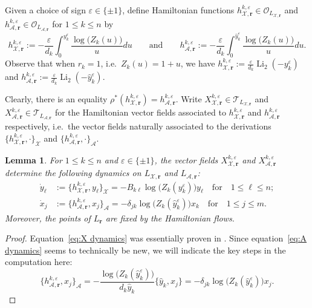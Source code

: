 \documentclass{amsart}
\newtheorem{lemma}[theorem]{Lemma}
\numberwithin{equation}{section}
\newcommand{\bfr}{{\boldsymbol{r}}}
\newcommand{\cA}{\mathcal{A}}
\newcommand{\cO}{\mathcal{O}}
\newcommand{\cT}{\mathcal{T}}
\newcommand{\cX}{\mathcal{X}}
\newcommand{\Li}{\operatorname{Li}}
\begin{document}
Given a choice of sign $\varepsilon\in\{\pm1\}$, define Hamiltonian functions $h^{k,\varepsilon}_{\cX,\bfr}\in\cO_{L_{\cX,\bfr}}$ and $h^{k,\varepsilon}_{\cA,\bfr}\in\cO_{L_{\cA,\bfr}}$ for $1\le k\le n$ by
\begin{equation}
  \label{eq:hamiltonians}
  h_{\cX,\bfr}^{k,\varepsilon}:=-\frac{\varepsilon}{d_k}\int_0^{y_k^\varepsilon} \frac{\log\big(Z_k(u)\big)}{u}du\qquad\text{and}\qquad h_{\cA,\bfr}^{k,\varepsilon}:=-\frac{\varepsilon}{d_k}\int_0^{\hat y_k^\varepsilon} \frac{\log\big(Z_k(u)\big)}{u}du.
\end{equation}
Observe that when $r_k=1$, i.e.\ $Z_k(u)=1+u$, we have $h_{\cX,\bfr}^{k,\varepsilon}:=\frac{\varepsilon}{d_k}\Li_2(-y_k^\varepsilon)$ and $h_{\cA,\bfr}^{k,\varepsilon}:=\frac{\varepsilon}{d_k}\Li_2(-\hat y_k^\varepsilon)$.

Clearly, there is an equality $\rho^*(h_{\cX,\bfr}^{k,\varepsilon})=h_{\cA,\bfr}^{k,\varepsilon}$.
Write $X_{\cX,\bfr}^{k,\varepsilon}\in\cT_{L_{\cX,\bfr}}$ and $X_{\cA,\bfr}^{k,\varepsilon}\in\cT_{L_{\cA,\bfr}}$ for the Hamiltonian vector fields associated to $h_{\cX,\bfr}^{k,\varepsilon}$ and $h_{\cA,\bfr}^{k,\varepsilon}$ respectively, i.e.\ the vector fields naturally associated to the derivations $\{h_{\cX,\bfr}^{k,\varepsilon},\cdot\}_\cX$ and $\{h_{\cA,\bfr}^{k,\varepsilon},\cdot\}_\cA$.
\begin{lemma}
  \label{le:hamiltonian dynamics}
  For $1\le k\le n$ and $\varepsilon\in\{\pm1\}$, the vector fields $X_{\cX,\bfr}^{k,\varepsilon}$ and $X_{\cA,\bfr}^{k,\varepsilon}$ determine the following dynamics on $L_{\cX,\bfr}$ and $L_{\cA,\bfr}$:
  \begin{align}
    \label{eq:X dynamics}
    \dot y_\ell&:=\{h_{\cX,\bfr}^{k,\varepsilon},y_\ell\}_\cX=-B_{k\ell}\log\big(Z_k(y_k^\varepsilon)\big)y_\ell\quad\text{for}\quad 1\le\ell\le n;\\
    \label{eq:A dynamics}
    \dot x_j&:=\{h_{\cA,\bfr}^{k,\varepsilon},x_j\}_\cA=-\delta_{jk}\log\big(Z_k(\hat y_k^\varepsilon)\big)x_k\quad\text{for}\quad 1\le j\le m.
  \end{align}
  Moreover, the points of $L_\bfr$ are fixed by the Hamiltonian flows.
\end{lemma}
\begin{proof}
  Equation~\eqref{eq:X dynamics} was essentially proven in \cite{MR3691969}.
  Since equation~\eqref{eq:A dynamics} seems to technically be new, we will indicate the key steps in the computation here:
  \[\{h_{\cA,\bfr}^{k,\varepsilon},x_j\}_\cA=-\frac{\log\big(Z_k(\hat y_k^\varepsilon)\big)}{d_k\hat y_k}\{\hat y_k,x_j\}=-\delta_{jk}\log\big(Z_k(\hat y_k^\varepsilon)\big)x_j.\]
\end{proof}
\end{document}
